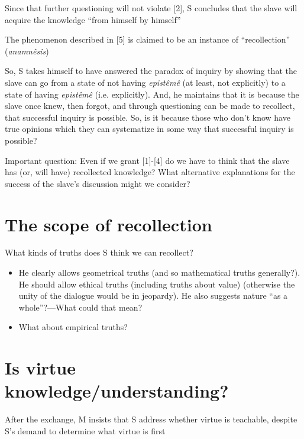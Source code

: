 \documentclass[11pt]{article}
\begin{document}
\noindent [5] Since that further questioning will not violate [2], S concludes that the slave will acquire the knowledge ``from himself by himself''
\vspace*{2mm}

\noindent [6] The phenomenon described in [5] is claimed to be an instance of ``recollection'' (\emph{anamn\^{e}sis})
\vspace*{2mm}

\noindent So, S takes himself to have answered the paradox of inquiry by showing that the slave can go from a state of not having \emph{epist\^{e}m\^{e}} (at least, not explicitly) to a state of having \emph{epist\^{e}m\^{e}} (i.e. explicitly). And, he maintains that it is because the slave once knew, then forgot, and through questioning can be made to recollect, that successful inquiry is possible. So, is it because those who don't know have true opinions which they can systematize in some way that successful inquiry is possible?
\vspace*{2mm}

\noindent Important question: Even if we grant [1]-[4] do we have to think that the slave has (or, will have) recollected knowledge? What alternative explanations for the success of the slave's discussion might we consider?

\section*{The scope of recollection}

\noindent What kinds of truths does S think we can recollect?

\begin{itemize}\item{He clearly allows geometrical truths (and so mathematical truths generally?). He should allow ethical truths (including truths about value) (otherwise the unity of the dialogue would be in jeopardy). He also suggests nature ``as a whole''?---What could that mean?}\item{What about empirical truths?}\end{itemize}

\section*{Is virtue knowledge/understanding?}

\noindent After the exchange, M insists that S address whether virtue is teachable, despite S's demand to determine what virtue is first
\vspace*{2mm}
\end{document}

